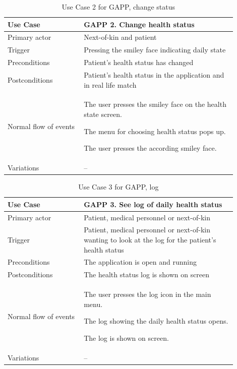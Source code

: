 \begin{table}
	\begin{center}
	    \begin{tabular}{|p{0.3\linewidth}|p{0.6\linewidth}|}
		    \hline
		    Use Case &  GAPP 2. Change health status \\ \hline
		    Primary actor & Next-of-kin and patient \\ \hline
		    Trigger & Pressing the smiley face indicating daily state \\ \hline
		    Preconditions & Patient's health status has changed \\ \hline
		    Postconditions & Patient's health status in the application and in real life match\\ \hline
		    Normal flow of events & 
		    	\begin{tabulenum}
		    	  \item The user presses the smiley face on the health state screen.
		    	  \item The menu for choosing health status pops up.
		    	  \item The user presses the according smiley face.
		    	\end{tabulenum}\\ \hline
		    Variations & -- \\ \hline
	    \end{tabular}
    \end{center}
    \caption{Use Case 2 for GAPP, change status}
    \label{tab:gappUseCase2}
\end{table}

\begin{table}
	\begin{center}
	    \begin{tabular}{|p{0.3\linewidth}|p{0.6\linewidth}|}
		    \hline
		    Use Case &  GAPP 3. See log of daily health status \\ \hline
		    Primary actor & Patient, medical personnel or next-of-kin\\ \hline
		    Trigger & Patient, medical personnel or next-of-kin wanting to look at the log for the patient's health status \\ \hline
		    Preconditions & The application is open and running \\ \hline
		    Postconditions & The health status log is shown on screen \\ \hline
		    Normal flow of events & 
		    	\begin{tabulenum}
		    	  \item The user presses the log icon in the main menu.
		    	  \item The log showing the daily health status opens.
		    	  \item The log is shown on screen.
		    	\end{tabulenum}\\ \hline
		    Variations & -- \\ \hline
	    \end{tabular}
    \end{center}
    \caption{Use Case 3 for GAPP, log}
    \label{tab:gappUseCase3}
\end{table}

